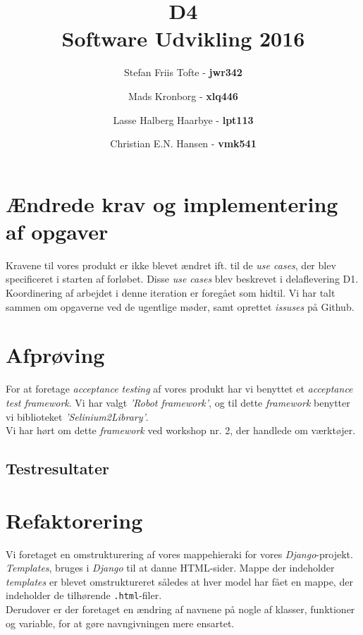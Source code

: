\documentclass[11pt]{article}
\title{
  \vspace{3cm}
  \Huge{D4} \\
  \Large{Software Udvikling 2016}
}
\author{
	\Large{Stefan Friis Tofte} - \textbf{jwr342}%
	\and
	\Large{Mads Kronborg} - \textbf{xlq446}%
	\and
	\Large{Lasse Halberg Haarbye} - \textbf{lpt113}%
	\and
	\Large{Christian E.N. Hansen} - \textbf{vmk541}%
}
\def \ColourPDF {../include/ku-farve}
\def \TitlePDF {../include/ku-en}  %
\begin{document}


\clearpage\maketitle
\thispagestyle{empty}

\newpage
\tableofcontents
\newpage

\section{Ændrede krav og implementering af opgaver}
Kravene til vores produkt er ikke blevet ændret ift. til de \textit{use cases}, der blev specificeret i starten af forløbet. Disse \textit{use cases} blev beskrevet i delaflevering D1. \\
Koordinering af arbejdet i denne iteration er foregået som hidtil. Vi har talt sammen om opgaverne ved de ugentlige møder, samt oprettet \textit{issuses} på Github.

\section{Afprøving}
For at foretage \textit{acceptance testing} af vores produkt har vi benyttet et \textit{acceptance test framework}. Vi har valgt \textit{'Robot framework'}, og til dette \textit{framework} benytter vi biblioteket \textit{'Selinium2Library'}. \\
Vi har hørt om dette \textit{framework} ved workshop nr. 2, der handlede om værktøjer.

\subsection{Testresultater}

\section{Refaktorering}
Vi foretaget en omstrukturering af vores mappehieraki for vores \textit{Django}-projekt. \textit{Templates}, bruges i \textit{Django} til at danne HTML-sider. Mappe der indeholder \textit{templates} er blevet omstruktureret således at hver model har fået en mappe, der indeholder de tilhørende \texttt{.html}-filer. \\
Derudover er der foretaget en ændring af navnene på nogle af klasser, funktioner og variable, for at gøre navngivningen mere ensartet.
\end{document}
